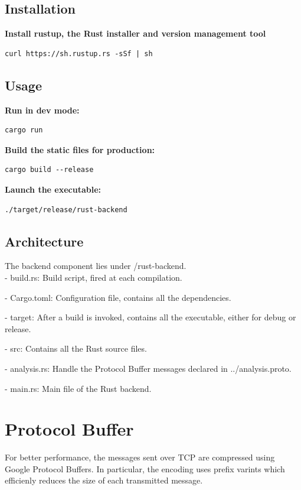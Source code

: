 \documentclass[12pt,hidelinks]{article}
\begin{document}
\subsection{Installation} 

\textbf{Install rustup, the Rust installer and version management tool}
\begin{verbatim}
curl https://sh.rustup.rs -sSf | sh
\end{verbatim}

\subsection{Usage} 

\textbf{Run in dev mode:}
\begin{verbatim}
cargo run
\end{verbatim}

\textbf{Build the static files for production:}
\begin{verbatim}
cargo build --release
\end{verbatim}

\textbf{Launch the executable:}
\begin{verbatim}
./target/release/rust-backend
\end{verbatim}

\subsection{Architecture}
The backend component lies under /rust-backend. \\

- build.rs:
Build script, fired at each compilation.

- Cargo.toml:
Configuration file, contains all the dependencies.

- target: 
After a build is invoked, contains all the executable, either for debug or release.

- src:
Contains all the Rust source files.

	\hspace*{10mm}- analysis.rs:
	Handle the Protocol Buffer messages declared in ../analysis.proto.

	\hspace*{10mm}- main.rs:
	Main file of the Rust backend.

\newpage

\section{Protocol Buffer}
\vspace{10.5cm}
For better performance, the messages sent over TCP are compressed using Google Protocol Buffers. In particular, the encoding uses prefix varints which efficienly reduces the size of each transmitted message. 
\end{document}
